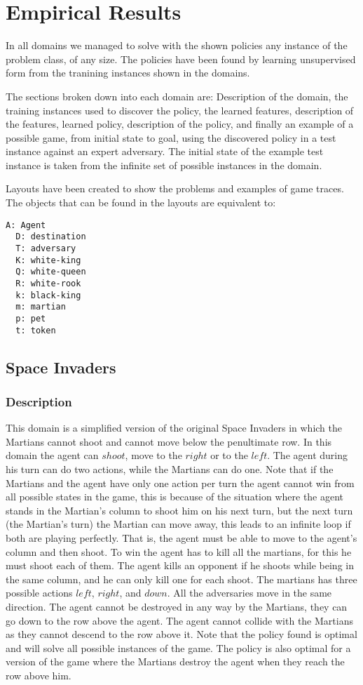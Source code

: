 \documentclass[a4paper]{article}
\begin{document}
\newpage

\section{Empirical Results}

In all domains we managed to solve with the shown policies any instance of the problem class, of any size. The policies have been found by learning unsupervised form from the tranining instances shown in the domains.

The sections broken down into each domain are: Description of the domain, the training instances used to discover the policy, the learned features, description of the features, learned policy, description of the policy, and finally an example of a possible game, from initial state to goal, using the discovered policy in a test instance against an expert adversary. The initial state of the example test instance is taken from the infinite set of possible instances in the domain.

Layouts have been created to show the problems and examples of game traces. The objects that can be found in the layouts are equivalent to:
\begin{Verbatim}[fontsize=\footnotesize]
  A: Agent
  D: destination
  T: adversary
  K: white-king
  Q: white-queen
  R: white-rook
  k: black-king
  m: martian
  p: pet
  t: token
\end{Verbatim}

\subsection{Space Invaders}
\subsubsection{Description}
This domain is a simplified version of the original Space Invaders in which the Martians cannot shoot and cannot move below the penultimate row. In this domain the agent can $shoot$, move to the $right$ or to the $left$. The agent during his turn can do two actions, while the Martians can do one. Note that if the Martians and the agent have only one action per turn the agent cannot win from all possible states in the game, this is because of the situation where the agent stands in the Martian's column to shoot him on his next turn, but the next turn (the Martian's turn) the Martian can move away, this leads to an infinite loop if both are playing perfectly. That is, the agent must be able to move to the agent's column and then shoot. To win the agent has to kill all the martians, for this he must shoot each of them. The agent kills an opponent if he shoots while being in the same column, and he can only kill one for each shoot. The martians has three possible actions $left$, $right$, and $down$. All the adversaries move in the same direction. The agent cannot be destroyed in any way by the Martians, they can go down to the row above the agent. The agent cannot collide with the Martians as they cannot descend to the row above it. Note that the policy found is optimal and will solve all possible instances of the game. The policy is also optimal for a version of the game where the Martians destroy the agent when they reach the row above him.
\end{document}
